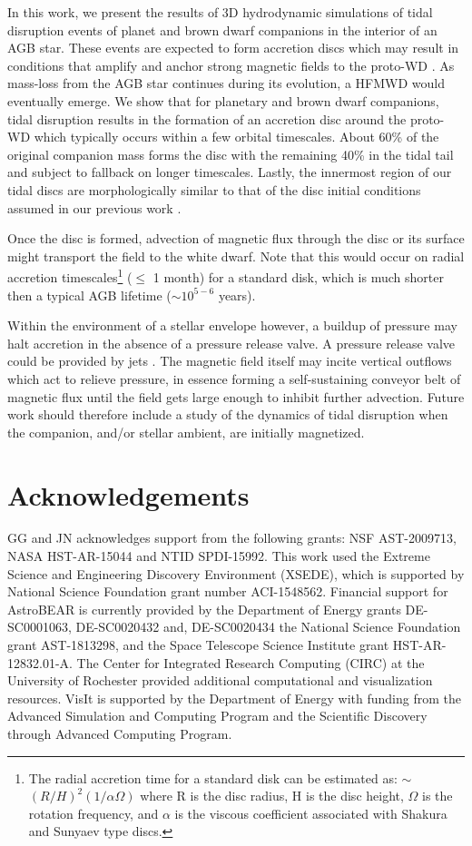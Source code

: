 \documentclass[fleqn,usenatbib]{mnras}
\begin{document}
In this work, we present the results of 3D hydrodynamic simulations of tidal disruption events of planet and brown dwarf companions in the interior of an AGB star. These events are expected to form accretion discs which may result in conditions that amplify and anchor strong magnetic fields to the proto-WD \citep{Nordhaus:2010aa}. As mass-loss from the AGB star continues during its evolution, a HFMWD would eventually emerge. We show that for planetary and brown dwarf companions, tidal disruption results in the formation of an accretion disc around the proto-WD which typically occurs within a few orbital timescales. About 60\% of the original companion mass forms the disc with the remaining 40\% in the tidal tail and subject to fallback on longer timescales. Lastly, the innermost region of our tidal discs are morphologically similar to that of the disc initial conditions assumed in our previous work \citep{Guidarelli2019}. 

Once the disc is formed, advection of magnetic flux through the disc or its surface might transport the field to the white dwarf. Note that this would occur
on radial accretion timescales\footnote{The radial accretion time 
for a standard disk can be estimated as:  
$\sim$$(R/ H)^2 (1/\alpha\Omega)$ where R is the disc radius, H is the disc height, $\Omega$ is the rotation frequency, and $\alpha$ is the viscous coefficient associated with Shakura and Sunyaev type discs.} ($\leq$ 1 month) for a standard disk, which is much shorter then a typical AGB lifetime ($\sim$$10^{5-6}$ years). 

Within the environment of a stellar envelope however, a buildup of pressure may halt accretion in the absence of a pressure release valve. A pressure release valve could be provided by jets \citep{Chamandy:2018aa}. The magnetic field itself  may incite vertical outflows which act to relieve pressure, in essence forming a self-sustaining conveyor belt of magnetic flux until the field gets large enough to inhibit further advection. Future work should therefore include a study of the dynamics of tidal disruption when the companion, and/or stellar ambient, are initially magnetized. 

\section*{Acknowledgements}

GG and JN acknowledges support from the following grants: NSF AST-2009713, NASA HST-AR-15044 and NTID SPDI-15992.  This work used the Extreme Science and Engineering Discovery Environment (XSEDE), which is supported by National Science Foundation grant number ACI-1548562. Financial support for AstroBEAR is currently provided by the Department of Energy grants DE-SC0001063, DE-SC0020432 and, DE-SC0020434 the National Science Foundation grant AST-1813298, and the Space Telescope Science Institute grant HST-AR-12832.01-A. The Center for Integrated Research Computing (CIRC) at the University of Rochester provided additional computational and visualization resources. {\rm VisIt} is supported by the Department of Energy with funding from the Advanced Simulation and Computing Program and the Scientific Discovery through Advanced Computing Program. 
\end{document}
